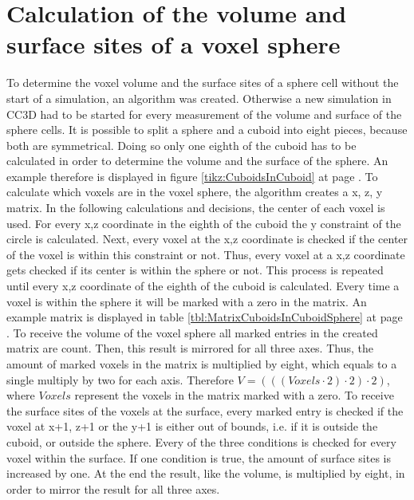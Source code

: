 \section{Calculation of the volume and surface sites of a voxel sphere}\label{sec:CreatedAlgorithm}
To determine the voxel volume and the surface sites of a sphere cell without the start of a simulation, an algorithm was created. Otherwise a new simulation in \ac{CC3D} had to be started for every measurement of the volume and surface of the sphere cells. \newline
It is possible to split a sphere and a cuboid into eight pieces, because both are symmetrical. Doing so only one eighth of the cuboid has to be calculated in order to determine the volume and the surface of the sphere. An example therefore is displayed in figure \ref{tikz:CuboidsInCuboid} at page \pageref{tikz:CuboidsInCuboid}. \newline
To calculate which voxels are in the voxel sphere, the algorithm creates a x, z, y matrix. In the following calculations and decisions, the center of each voxel is used. For every x,z coordinate in the eighth of the cuboid the y constraint of the circle is calculated. Next, every voxel at the x,z coordinate is checked if the center of the voxel is within this constraint or not. Thus, every voxel at a x,z coordinate gets checked if its center is within the sphere or not. This process is repeated until every x,z coordinate of the eighth of the cuboid is calculated. Every time a voxel is within the sphere it will be marked with a zero in the matrix. An example matrix is displayed in table \ref{tbl:MatrixCuboidsInCuboidSphere} at page \pageref{tbl:MatrixCuboidsInCuboidSphere}. \newline
To receive the volume of the voxel sphere all marked entries in the created matrix are count. Then, this result is mirrored for all three axes. Thus, the amount of marked voxels in the matrix is multiplied by eight, which equals to a single multiply by two for each axis. Therefore $V=(((Voxels \cdot 2) \cdot 2) \cdot 2)$, where $Voxels$ represent the voxels in the matrix marked with a zero.
To receive the surface sites of the voxels at the surface, every marked entry is checked if the voxel at x+1, z+1 or the y+1 is either out of bounds, i.e. if it is outside the cuboid, or outside the sphere. Every of the three conditions is checked for every voxel within the surface. If one condition is true, the amount of surface sites is increased by one. At the end the result, like the volume, is multiplied by eight, in order to mirror the result for all three axes.




